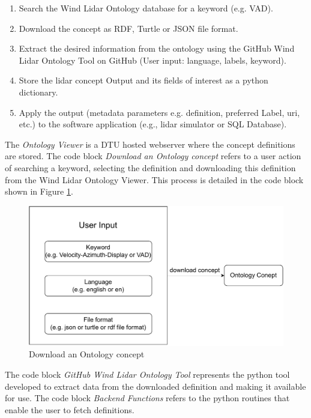 \documentclass[remotesensing,article,submit,pdftex,moreauthors]{Definitions/mdpi}
\begin{document}
\begin{enumerate}
    \item Search the Wind Lidar Ontology database for a keyword (e.g. VAD).
    \item Download the concept as RDF, Turtle or JSON file format.
    \item Extract the desired information from the ontology using the GitHub Wind Lidar Ontology Tool on GitHub (User input: language, labels, keyword).
    \item Store the lidar concept Output and its fields of interest as a python dictionary.
    \item Apply the output (metadata parameters e.g. definition, preferred Label, uri, etc.) to the software application (e.g., lidar simulator or SQL Database).
\end{enumerate}

The \textit{Ontology Viewer} is a DTU hosted webserver where the concept definitions are stored. The code block \textit{Download an Ontology concept} refers to a user action of searching a keyword, selecting the definition and downloading this definition from the Wind Lidar Ontology Viewer. This process is detailed in the code block shown in Figure \ref{fig:download_concept}. 

\begin{figure}[htpb!]
    \centering
    \includegraphics[width=\textwidth]{Figures/download_concept.pdf}
    \caption{Download an Ontology concept}
    \label{fig:download_concept}
\end{figure}

The code block \textit{GitHub Wind Lidar Ontology Tool} represents the python tool developed to extract data from the downloaded definition and making it available for use. The code block \textit{Backend Functions} refers to the python routines that enable the user to fetch definitions.
\end{document}
